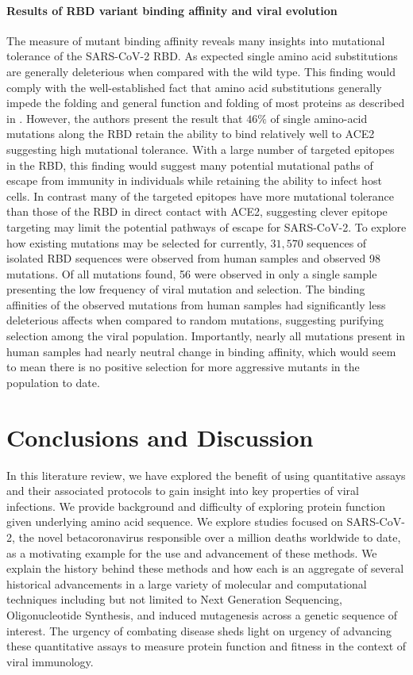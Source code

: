 \documentclass{article}
\begin{document}
\paragraph{Results of RBD variant binding affinity and viral evolution}
The measure of mutant binding affinity reveals many insights into mutational tolerance of the SARS-CoV-2 RBD.
As expected single amino acid substitutions are generally deleterious when compared with the wild type.
This finding would comply with the well-established fact that amino acid substitutions generally impede the folding and general function and folding of most proteins as described in \citet{Soskine2010}.
However, the authors present the result that $46\%$ of single amino-acid mutations along the RBD retain the ability to bind relatively well to ACE2 suggesting high mutational tolerance.
With a large number of targeted epitopes in the RBD, this finding would suggest many potential mutational paths of escape from immunity in individuals while retaining the ability to infect host cells.
In contrast many of the targeted epitopes have more mutational tolerance than those of the RBD in direct contact with ACE2, suggesting clever epitope targeting may limit the potential pathways of escape for SARS-CoV-2.
To explore how existing mutations may be selected for currently, $31,570$ sequences of isolated RBD sequences were observed from human samples and observed 98 mutations.
Of all mutations found, 56 were observed in only a single sample presenting the low frequency of viral mutation and selection.
The binding affinities of the observed mutations from human samples had significantly less deleterious affects when compared to random mutations, suggesting purifying selection among the viral population.
Importantly, nearly all mutations present in human samples had nearly neutral change in binding affinity, which would seem to mean there is no positive selection for more aggressive mutants in the population to date.

\section*{Conclusions and Discussion}

In this literature review, we have explored the benefit of using quantitative assays and their associated protocols to gain insight into key properties of viral infections.
We provide background and difficulty of exploring protein function given underlying amino acid sequence.
We explore studies focused on SARS-CoV-2, the novel betacoronavirus responsible over a million deaths worldwide to date, as a motivating example for the use and advancement of these methods.
We explain the history behind these methods and how each is an aggregate of several historical advancements in a large variety of molecular and computational techniques including but not limited to Next Generation Sequencing, Oligonucleotide Synthesis, and induced mutagenesis across a genetic sequence of interest.
The urgency of combating disease sheds light on urgency of advancing these quantitative assays to measure protein function and fitness in the context of viral immunology.
\end{document}
